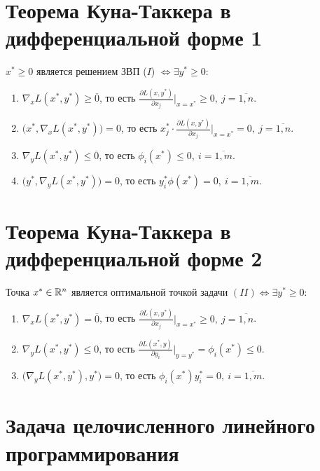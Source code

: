 \section{Теорема Куна-Таккера в дифференциальной форме 1}

\begin{theorem}
	$x^* \geqslant 0$ является решением ЗВП ($I$) $\iff \exists y^* \geqslant 0$:
	\begin{enumerate}
		\item $\nabla_x L(x^*,y^*)\geqslant \overline{0}$, то есть $\frac{\partial L(x,y^*)}{\partial x_j}\Big|_{x=x^*} \geqslant 0, \ j = \overline{1,n}$.
		\item $\big(x^*,\nabla_x L(x^*,y^*)\big) = 0$, то есть $x_{j}^{*}\cdot \frac{\partial L(x,y^*)}{\partial x_j}\Big|_{x=x^*}=0, \ j = \overline{1,n}$.
		\item $\nabla_y L(x^*,y^*)\leqslant \overline{0}$, то есть $\phi_i(x^*)\leqslant 0, \ i = \overline{1,m}$.
		\item $\big(y^*,\nabla_y L(x^*,y^*)\big) = 0$, то есть $y_{i}^{*} \phi(x^*) = 0, \ i = \overline{1,m}$.
	\end{enumerate}
\end{theorem}

\section{Теорема Куна-Таккера в дифференциальной форме 2}

\begin{theorem}
	Точка $x^* \in \mathbb{R}^n$ является оптимальной точкой задачи $(II) \iff \exists y^*\geqslant 0$:
	\begin{enumerate}
		\item $\nabla_x L(x^*,y^*) = \overline{0}$, то есть $\frac{\partial L(x,y^*)}{\partial x_j}\Big|_{x=x^*}\geqslant 0, \ j = \overline{1,n}$.
		\item $\nabla_y L(x^*,y^*)\leqslant 0$, то есть $\frac{\partial L(x^*,y)}{\partial y_i}\Big|_{y=y^*} = \phi_i(x^*)\leqslant 0$.
		\item $\big(\nabla_y L(x^*,y^*),y^*\big)=0$, то есть $\phi_i(x^*)y_{i}^{*} = 0, \ i = \overline{1,m}$.
	\end{enumerate}
\end{theorem}

\section{Задача целочисленного линейного программирования}

